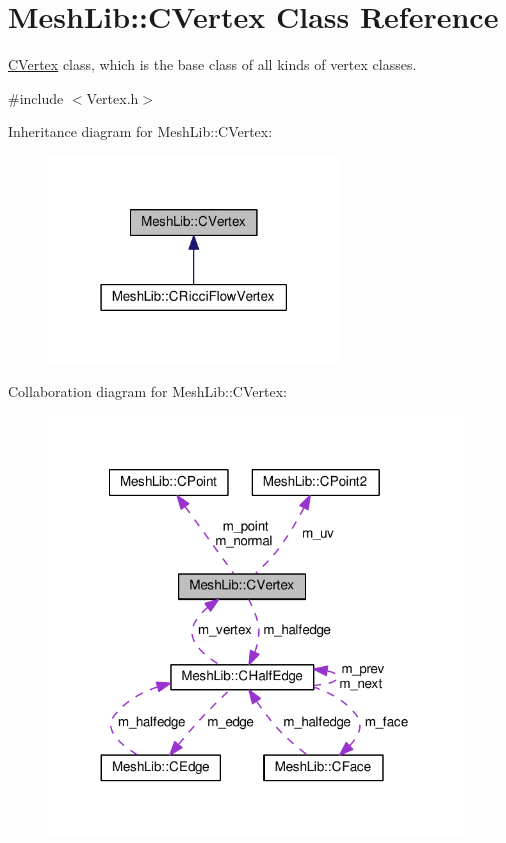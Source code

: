 \hypertarget{class_mesh_lib_1_1_c_vertex}{}\section{Mesh\+Lib\+:\+:C\+Vertex Class Reference}
\label{class_mesh_lib_1_1_c_vertex}


\hyperlink{class_mesh_lib_1_1_c_vertex}{C\+Vertex} class, which is the base class of all kinds of vertex classes.  




{\ttfamily \#include $<$Vertex.\+h$>$}



Inheritance diagram for Mesh\+Lib\+:\+:C\+Vertex\+:
\nopagebreak
\begin{figure}[H]
\begin{center}
\leavevmode
\includegraphics[width=219pt]{class_mesh_lib_1_1_c_vertex__inherit__graph}
\end{center}
\end{figure}


Collaboration diagram for Mesh\+Lib\+:\+:C\+Vertex\+:
\nopagebreak
\begin{figure}[H]
\begin{center}
\leavevmode
\includegraphics[width=311pt]{class_mesh_lib_1_1_c_vertex__coll__graph}
\end{center}
\end{figure}
